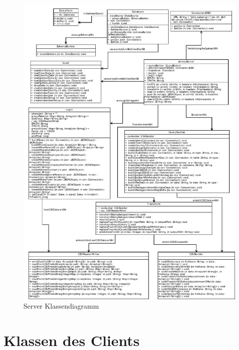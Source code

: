 \begin{figure}[htbp]
\begin{center}
\includegraphics[width=1.0\textwidth]{pics/ServerKlassendiagramm.pdf}
\caption{Server Klassendiagramm}
\label{umsetzung_klassendiagramm_server}
\end{center}
\end{figure}

\section{Klassen des Clients}

